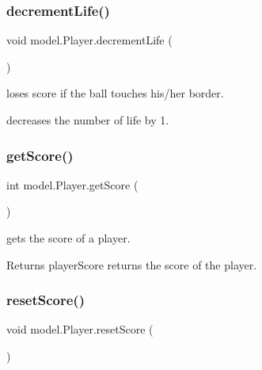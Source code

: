 \subsubsection{\texorpdfstring{decrement\+Life()}{decrementLife()}}
{\footnotesize\ttfamily void model.\+Player.\+decrement\+Life (\begin{DoxyParamCaption}{ }\end{DoxyParamCaption})}



loses score if the ball touches his/her border. 

decreases the number of life by 1. \hypertarget{classmodel_1_1_player_a9e027a7ee08d451cde3e6743e2ef1d6d}{}\label{classmodel_1_1_player_a9e027a7ee08d451cde3e6743e2ef1d6d} 
\subsubsection{\texorpdfstring{get\+Score()}{getScore()}}
{\footnotesize\ttfamily int model.\+Player.\+get\+Score (\begin{DoxyParamCaption}{ }\end{DoxyParamCaption})}



gets the score of a player. 

\begin{DoxyReturn}{Returns}
player\+Score returns the score of the player. 
\end{DoxyReturn}
\hypertarget{classmodel_1_1_player_a1ce780b4bc3a1564934975b18e68df8c}{}\label{classmodel_1_1_player_a1ce780b4bc3a1564934975b18e68df8c} 
\subsubsection{\texorpdfstring{reset\+Score()}{resetScore()}}
{\footnotesize\ttfamily void model.\+Player.\+reset\+Score (\begin{DoxyParamCaption}{ }\end{DoxyParamCaption})}

\hypertarget{classmodel_1_1_player_acb5f4cdd639aa3e68a5003ec81bdd47c}{}\label{classmodel_1_1_player_acb5f4cdd639aa3e68a5003ec81bdd47c} 
